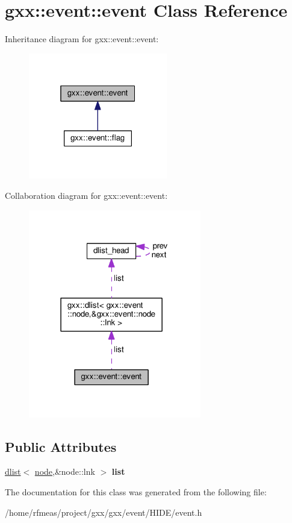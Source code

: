 \hypertarget{classgxx_1_1event_1_1event}{}\section{gxx\+:\+:event\+:\+:event Class Reference}
\label{classgxx_1_1event_1_1event}


Inheritance diagram for gxx\+:\+:event\+:\+:event\+:
\nopagebreak
\begin{figure}[H]
\begin{center}
\leavevmode
\includegraphics[width=172pt]{classgxx_1_1event_1_1event__inherit__graph}
\end{center}
\end{figure}


Collaboration diagram for gxx\+:\+:event\+:\+:event\+:
\nopagebreak
\begin{figure}[H]
\begin{center}
\leavevmode
\includegraphics[width=214pt]{classgxx_1_1event_1_1event__coll__graph}
\end{center}
\end{figure}
\subsection*{Public Attributes}
\begin{DoxyCompactItemize}
\item 
\hyperlink{classgxx_1_1dlist}{dlist}$<$ \hyperlink{classgxx_1_1event_1_1node}{node},\&node\+::lnk $>$ {\bfseries list}\hypertarget{classgxx_1_1event_1_1event_a3fc2ad4af4ed9db855872dd6ca806743}{}\label{classgxx_1_1event_1_1event_a3fc2ad4af4ed9db855872dd6ca806743}

\end{DoxyCompactItemize}


The documentation for this class was generated from the following file\+:\begin{DoxyCompactItemize}
\item 
/home/rfmeas/project/gxx/gxx/event/\+H\+I\+D\+E/event.\+h\end{DoxyCompactItemize}
